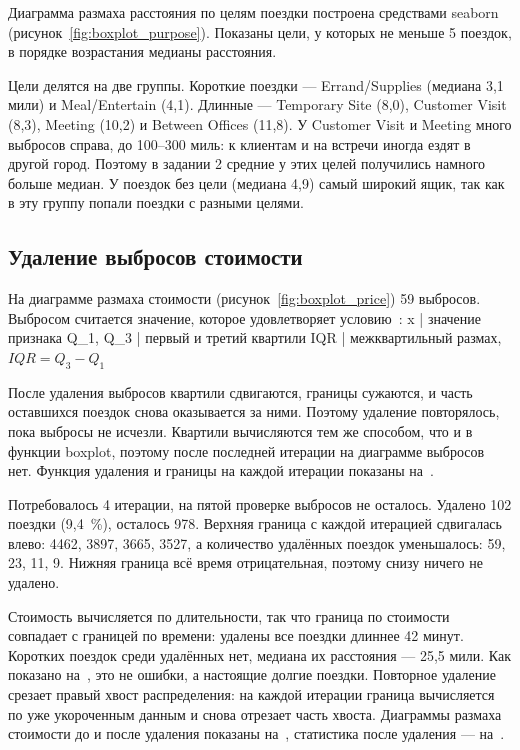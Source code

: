 \documentclass[a4paper,14pt]{extarticle}
\begin{document}
Диаграмма размаха расстояния по целям поездки построена средствами seaborn (рисунок~\ref{fig:boxplot_purpose}). Показаны цели, у которых не меньше 5 поездок, в порядке возрастания медианы расстояния.


Цели делятся на две группы. Короткие поездки — Errand/Supplies (медиана 3,1 мили) и Meal/Entertain (4,1). Длинные — Temporary Site (8,0), Customer Visit (8,3), Meeting (10,2) и Between Offices (11,8). У Customer Visit и Meeting много выбросов справа, до 100–300 миль: к клиентам и на встречи иногда ездят в другой город. Поэтому в задании 2 средние у этих целей получились намного больше медиан. У поездок без цели (медиана 4,9) самый широкий ящик, так как в эту группу попали поездки с разными целями.

\subsection{Удаление выбросов стоимости}

На диаграмме размаха стоимости (рисунок~\ref{fig:boxplot_price}) 59 выбросов. Выбросом считается значение, которое удовлетворяет условию~:
x | значение признака
Q_1, Q_3 | первый и третий квартили
IQR | межквартильный размах, $IQR = Q_3 - Q_1$

После удаления выбросов квартили сдвигаются, границы сужаются, и часть оставшихся поездок снова оказывается за ними. Поэтому удаление повторялось, пока выбросы не исчезли. Квартили вычисляются тем же способом, что и в функции boxplot, поэтому после последней итерации на диаграмме выбросов нет. Функция удаления и границы на каждой итерации показаны на~.


Потребовалось 4 итерации, на пятой проверке выбросов не осталось. Удалено 102 поездки (9,4~\%), осталось 978. Верхняя граница с каждой итерацией сдвигалась влево: 4462, 3897, 3665, 3527, а количество удалённых поездок уменьшалось: 59, 23, 11, 9. Нижняя граница всё время отрицательная, поэтому снизу ничего не удалено.

Стоимость вычисляется по длительности, так что граница по стоимости совпадает с границей по времени: удалены все поездки длиннее 42 минут. Коротких поездок среди удалённых нет, медиана их расстояния — 25,5 мили. Как показано на~, это не ошибки, а настоящие долгие поездки. Повторное удаление срезает правый хвост распределения: на каждой итерации граница вычисляется по уже укороченным данным и снова отрезает часть хвоста. Диаграммы размаха стоимости до и после удаления показаны на~, статистика после удаления — на~.
\end{document}
